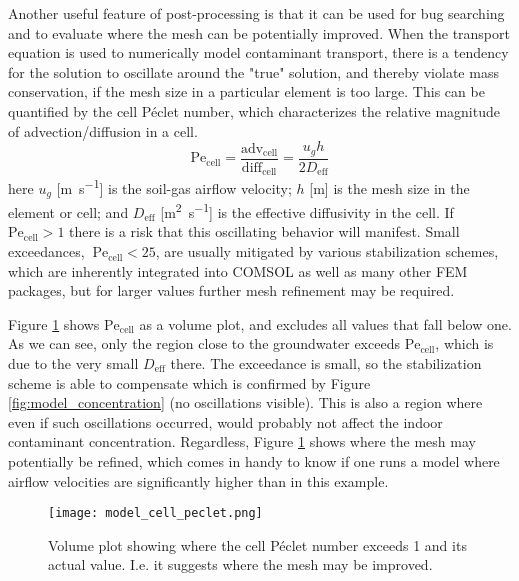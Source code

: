 Another useful feature of post-processing is that it can be used for bug searching and to evaluate where the mesh can be potentially improved.
When the transport equation is used to numerically model contaminant transport, there is a tendency for the solution to oscillate around the "true" solution, and thereby violate mass conservation, if the mesh size in a particular element is too large.
This can be quantified by the cell Péclet number, which characterizes the relative magnitude of advection/diffusion in a cell.
\begin{equation}
  \mathrm{Pe_{cell}} = \frac{\mathrm{adv_{cell}}}{\mathrm{diff_{cell}}} = \frac{u_g h}{2 D_\mathrm{eff}}
\end{equation}
here $u_g$ [\si{\metre\per\second}] is the soil-gas airflow velocity;
$h$ [\si{\metre}] is the mesh size in the element or cell;
and $D_\mathrm{eff}$ [\si{\metre\squared\per\second}] is the effective diffusivity in the cell.
If $\mathrm{Pe_{cell}} > 1$ there is a risk that this oscillating behavior will manifest.
Small exceedances, $~\mathrm{Pe_{cell}} < 25$, are usually mitigated by various stabilization schemes, which are inherently integrated into COMSOL as well as many other FEM packages, but for larger values further mesh refinement may be required.\par

Figure \ref{fig:model_cell_peclet} shows $\mathrm{Pe_{cell}}$ as a volume plot, and excludes all values that fall below one.
As we can see, only the region close to the groundwater exceeds $\mathrm{Pe_{cell}}$, which is due to the very small $D_\mathrm{eff}$ there.
The exceedance is small, so the stabilization scheme is able to compensate which is confirmed by Figure \ref{fig:model_concentration} (no oscillations visible).
This is also a region where even if such oscillations occurred, would probably not affect the indoor contaminant concentration.
Regardless, Figure \ref{fig:model_cell_peclet} shows where the mesh may potentially be refined, which comes in handy to know if one runs a model where airflow velocities are significantly higher than in this example.\par

\begin{figure}[htb!]
  \centering
  \texttt{[image: model\_cell\_peclet.png]}
  \caption{Volume plot showing where the cell Péclet number exceeds 1 and its actual value. I.e. it suggests where the mesh may be improved.}
  \label{fig:model_cell_peclet}
\end{figure}
